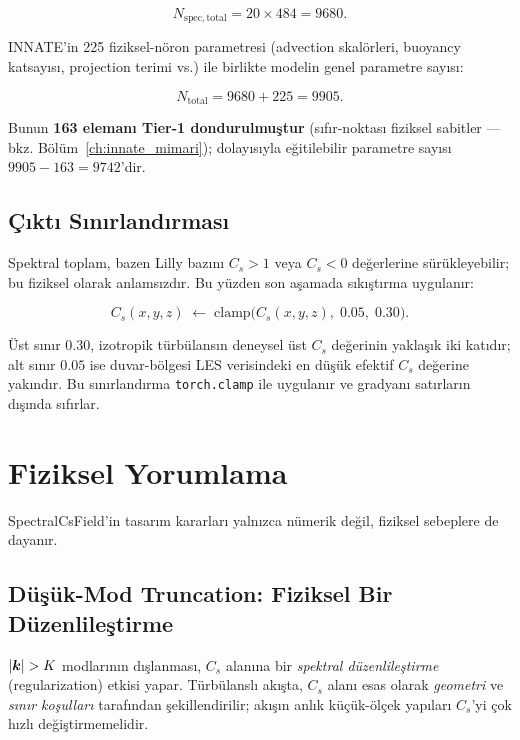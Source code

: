 \begin{equation}
  N_{\mathrm{spec,total}} = 20\times 484 = 9680.
\end{equation}

INNATE'in 225 fiziksel-nöron parametresi (advection skalörleri,
buoyancy katsayısı, projection terimi vs.) ile birlikte modelin
genel parametre sayısı:

\begin{equation}
  N_{\mathrm{total}} = 9680 + 225 = 9905.
\end{equation}

Bunun \textbf{163 elemanı Tier-1 dondurulmuştur} (sıfır-noktası fiziksel
sabitler — bkz. Bölüm~\ref{ch:innate_mimari}); dolayısıyla eğitilebilir
parametre sayısı $9905-163=9742$'dir.

\subsection{Çıktı Sınırlandırması}

Spektral toplam, bazen Lilly bazını $C_s>1$ veya $C_s<0$ değerlerine
sürükleyebilir; bu fiziksel olarak anlamsızdır. Bu yüzden son aşamada
sıkıştırma uygulanır:

\begin{equation}
  C_s(x,y,z) \;\leftarrow\; \mathrm{clamp}\!\bigl(C_s(x,y,z),\; 0.05,\; 0.30\bigr).
  \label{eq:cs-clamp}
\end{equation}

Üst sınır $0.30$, izotropik türbülansın deneysel üst $C_s$ değerinin
yaklaşık iki katıdır; alt sınır $0.05$ ise duvar-bölgesi LES verisindeki
en düşük efektif $C_s$ değerine yakındır. Bu sınırlandırma
\texttt{torch.clamp} ile uygulanır ve gradyanı satırların dışında sıfırlar.

\section{Fiziksel Yorumlama}
\label{sec:fiziksel-yorum}

SpectralCsField'in tasarım kararları yalnızca nümerik değil, fiziksel
sebeplere de dayanır.

\subsection{Düşük-Mod Truncation: Fiziksel Bir Düzenlileştirme}

$|\bm{k}| > K$ modlarının dışlanması, $C_s$ alanına bir \emph{spektral
düzenlileştirme} (regularization) etkisi yapar. Türbülanslı akışta,
$C_s$ alanı esas olarak \emph{geometri} ve \emph{sınır koşulları} tarafından
şekillendirilir; akışın anlık küçük-ölçek yapıları $C_s$'yi çok hızlı
değiştirmemelidir.

